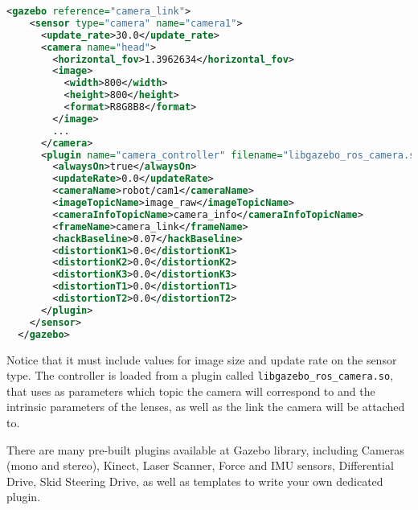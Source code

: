 \begin{lstlisting}[caption=Camera Description., language=XML]
  <gazebo reference="camera_link">
    <sensor type="camera" name="camera1">
      <update_rate>30.0</update_rate>
      <camera name="head">
        <horizontal_fov>1.3962634</horizontal_fov>
        <image>
          <width>800</width>
          <height>800</height>
          <format>R8G8B8</format>
        </image>
        ...
      </camera>
      <plugin name="camera_controller" filename="libgazebo_ros_camera.so">
        <alwaysOn>true</alwaysOn>
        <updateRate>0.0</updateRate>
        <cameraName>robot/cam1</cameraName>
        <imageTopicName>image_raw</imageTopicName>
        <cameraInfoTopicName>camera_info</cameraInfoTopicName>
        <frameName>camera_link</frameName>
        <hackBaseline>0.07</hackBaseline>
        <distortionK1>0.0</distortionK1>
        <distortionK2>0.0</distortionK2>
        <distortionK3>0.0</distortionK3>
        <distortionT1>0.0</distortionT1>
        <distortionT2>0.0</distortionT2>
      </plugin>
    </sensor>
  </gazebo>
\end{lstlisting}

Notice that it must include values for image size and update rate on the sensor type. The controller is loaded from a plugin called \texttt{libgazebo\_ros\_camera.so}, that uses as parameters which topic the camera will correspond to and the intrinsic parameters of the lenses, as well as the link the camera will be attached to.

There are many pre-built plugins available at Gazebo library, including Cameras (mono and stereo), Kinect, Laser Scanner, Force and IMU sensors, Differential Drive, Skid Steering Drive, as well as templates to write your own dedicated plugin.





